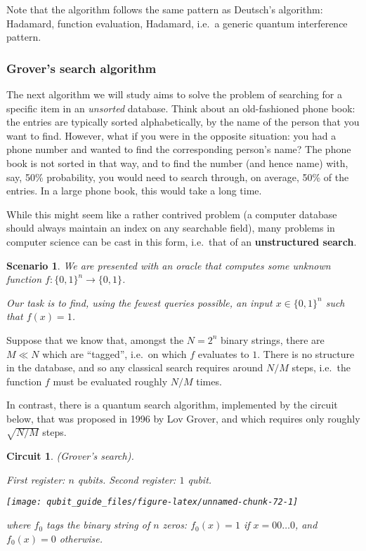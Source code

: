 \documentclass[fleqn]{article}
\newtheorem*{scenario}{Scenario}
\newtheorem*{circuit}{Circuit}
\begin{document}
Note that the algorithm follows the same pattern as Deutsch's algorithm: Hadamard, function evaluation, Hadamard, i.e.~a generic quantum interference pattern.

\hypertarget{grovers-search-algorithm}{%
\subsubsection{Grover's search algorithm}\label{grovers-search-algorithm}}

The next algorithm we will study aims to solve the problem of searching for a specific item in an \emph{unsorted} database.
Think about an old-fashioned phone book: the entries are typically sorted alphabetically, by the name of the person that you want to find.
However, what if you were in the opposite situation: you had a phone number and wanted to find the corresponding person's name?
The phone book is not sorted in that way, and to find the number (and hence name) with, say, 50\% probability, you would need to search through, on average, 50\% of the entries.
In a large phone book, this would take a long time.

While this might seem like a rather contrived problem (a computer database should always maintain an index on any searchable field), many problems in computer science can be cast in this form, i.e.~that of an \textbf{unstructured search}.

\begin{scenario}
We are presented with an oracle that computes some unknown function \(f\colon\{0,1\}^n\to\{0,1\}\).

Our task is to find, using the fewest queries possible, an input \(x\in\{0,1\}^n\) such that \(f(x)=1\).

\end{scenario}

Suppose that we know that, amongst the \(N=2^n\) binary strings, there are \(M\ll N\) which are ``tagged'', i.e.~on which \(f\) evaluates to \(1\).
There is no structure in the database, and so any classical search requires around \(N/M\) steps, i.e.~the function \(f\) must be evaluated roughly \(N/M\) times.

In contrast, there is a quantum search algorithm, implemented by the circuit below, that was proposed in 1996 by Lov Grover, and which requires only roughly \(\sqrt{N/M}\) steps.

\begin{circuit}

(Grover's search).

\emph{First register: \(n\) qubits. Second register: \(1\) qubit.}

\begin{center}\texttt{[image: qubit\_guide\_files/figure-latex/unnamed-chunk-72-1]} \end{center}

where \(f_0\) tags the binary string of \(n\) zeros: \(f_0(x)=1\) if \(x=00\ldots0\), and \(f_0(x)=0\) otherwise.


\end{circuit}
\end{document}
